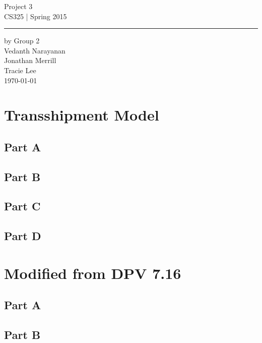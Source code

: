 \documentclass[11pt,letterpaper]{article}
\begin{document}
\begin{titlepage}
    \vspace*{4cm}
    \begin{flushright}
    {\huge
        Project 3\\[5mm]
    }
    {\large
        CS325 | Spring 2015
     }
    \end{flushright}
\hrule
    \begin{flushright}
	by Group 2\\
	Vedanth Narayanan\\
	Jonathan Merrill\\
	Tracie Lee\\
    \vfill
	\today\\
    \end{flushright}
\end{titlepage}

\raggedright

\section{Transshipment Model}
\subsection*{Part A}


\subsection*{Part B}


\subsection*{Part C}
	

\subsection*{Part D}


\section{Modified from DPV 7.16}
\subsection*{Part A}


\subsection*{Part B}
\end{document}
